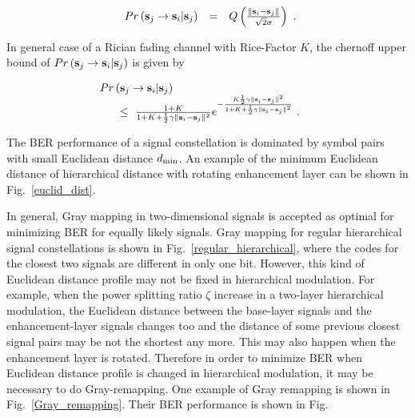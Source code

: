 \documentclass[10pt,fleqn, twocolumn]{IEEEtran}
\newcommand{\bs}{{\bf s}}
\begin{document}
\begin{equation}
\begin{array}{rcl}
Pr\left(\bs_{j}\rightarrow\bs_{i}|\bs_{j}\right)&=&Q\left(\frac{\|\bs_{i}-\bs_{j}\|}{\sqrt{2}\sigma}\right)
\end{array}.\label{prior_error}
\end{equation}

\noindent In general case of a Rician fading channel with
Rice-Factor $K$, the chernoff upper bound of
$Pr\left(\bs_{j}\rightarrow\bs_{i}|\bs_{j}\right)$ is given by

\begin{equation}
\begin{array}{ll}
\hspace{-0.2in}Pr\left(\bs_{j}\rightarrow\bs_{i}|\bs_{j}\right)&\\
&\hspace{-0.8in}\leq\
\frac{1+K}{1+K+\frac{1}{2}\gamma\|\bs_{i}-\bs_{j}\|^2}e^{-\frac{K\frac{1}{2}\gamma\|\bs_{i}-\bs_{j}\|^2}{1+K+\frac{1}{2}\gamma\|\bs_{i}-\bs_{j}\|^2}}\
.
\end{array}\label{prior_error_fading}
\end{equation}


\noindent The BER performance of a signal constellation is
dominated by symbol pairs with small Euclidean distance $d_{\rm
min}$. An example of the minimum Euclidean distance of
hierarchical distance with rotating enhancement layer can be shown
in Fig.~\ref{euclid_dist}.

In general, Gray mapping in two-dimensional signals is accepted as
optimal for minimizing BER for equally likely signals. Gray
mapping for regular hierarchical signal constellations is shown in
Fig.~\ref{regular_hierarchical}, where the codes for the closest
two signals are different in only one bit. However, this kind of
Euclidean distance profile may not be fixed in hierarchical
modulation. For example, when the power splitting ratio $\zeta$
increase in a two-layer hierarchical modulation, the Euclidean
distance between the base-layer signals and the enhancement-layer
signals changes too and the distance of some previous closest
signal pairs may be not the shortest any more. This may also
happen when the enhancement layer is rotated. Therefore in order
to minimize BER when Euclidean distance profile is changed in
hierarchical modulation, it may be necessary to do Gray-remapping.
One example of Gray remapping is shown in
Fig.~\ref{Gray_remapping}. Their BER performance is shown in Fig.
\end{document}
